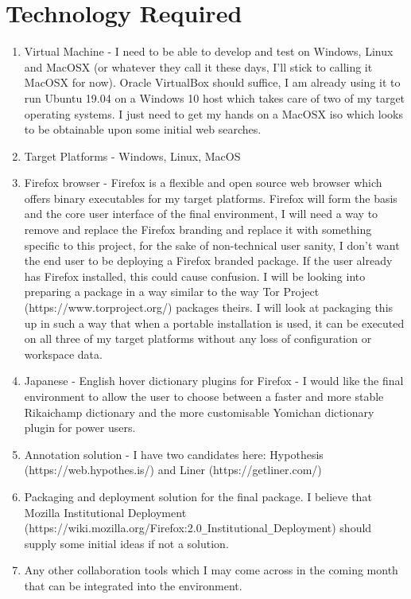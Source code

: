 \documentclass{article}
\begin{document}
\section{Technology Required}
\begin{enumerate}
    \item Virtual Machine - I need to be able to develop and test on Windows, Linux and MacOSX (or whatever they call it these days, I'll stick to calling it MacOSX for now). Oracle VirtualBox should suffice, I am already using it to run Ubuntu 19.04 on a Windows 10 host which takes care of two of my target operating systems. I just need to get my hands on a MacOSX iso which looks to be obtainable upon some initial web searches.
    \item Target Platforms - Windows, Linux, MacOS
    \item Firefox browser - Firefox is a flexible and open source web browser which offers binary executables for my target platforms. Firefox will form the basis and the core user interface of the final environment, I will need a way to remove and replace the Firefox branding and replace it with something specific to this project, for the sake of non-technical user sanity, I don't want the end user to be deploying a Firefox branded package. If the user already has Firefox installed, this could cause confusion. I will be looking into preparing a package in a way similar to the way Tor Project (https://www.torproject.org/) packages theirs. I will look at packaging this up in such a way that when a portable installation is used, it can be executed on all three of my target platforms without any loss of configuration or workspace data.
    \item Japanese - English hover dictionary plugins for Firefox - I would like the final environment to allow the user to choose between a faster and more stable Rikaichamp dictionary and the more customisable Yomichan dictionary plugin for power users.
    \item Annotation solution - I have two candidates here: Hypothesis \newline (https://web.hypothes.is/) and Liner (https://getliner.com/)
    \item Packaging and deployment solution for the final package. I believe that Mozilla Institutional Deployment \newline (https://wiki.mozilla.org/Firefox:2.0\verb|_|Institutional\verb|_|Deployment) should supply some initial ideas if not a solution.
    \item Any other collaboration tools which I may come across in the coming month that can be integrated into the environment.
\end{enumerate}
\end{document}
